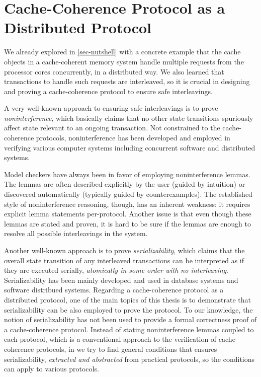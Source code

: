 \section{Cache-Coherence Protocol as a Distributed Protocol}

We already explored in \autoref{sec-nutshell} with a concrete example that the cache objects in a cache-coherent memory system handle multiple requests from the processor cores concurrently, in a distributed way.
We also learned that transactions to handle such requests are interleaved, so it is crucial in designing and proving a cache-coherence protocol to ensure safe interleavings.

A very well-known approach to ensuring safe interleavings is to prove \emph{noninterference}, which basically claims that no other state transitions spuriously affect state relevant to an ongoing transaction.
Not constrained to the cache-coherence protocols, noninterference has been developed and employed in verifying various computer systems including concurrent software and distributed systems.

Model checkers have always been in favor of employing noninterference lemmas.
The lemmas are often described explicitly by the user (guided by intuition) or discovered automatically (typically guided by counterexamples).
The established style of noninterference reasoning, though, has an inherent weakness: it requires explicit lemma statements per-protocol.
Another issue is that even though these lemmas are stated and proven, it is hard to be sure if the lemmas are enough to resolve all possible interleavings in the system.

Another well-known approach is to prove \emph{serializability}, which claims that the overall state transition of any interleaved transactions can be interpreted as if they are executed serially, \ie{} \emph{atomically in some order with no interleaving}.
Serializability has been mainly developed and used in database systems and software distribued systems.
Regarding a cache-coherence protocol as a distributed protocol, one of the main topics of this thesis is to demonstrate that serializability can be also employed to prove the protocol.
To our knowledge, the notion of serializability has not been used to provide a formal correctness proof of a cache-coherence protocol.
Instead of stating noninterference lemmas coupled to each protocol, which is a conventional approach to the verification of cache-coherence protocols, in \hemiola{} we try to find general conditions that ensures serializability, \emph{extracted and abstracted} from practical protocols, so the conditions can apply to various protocols.

